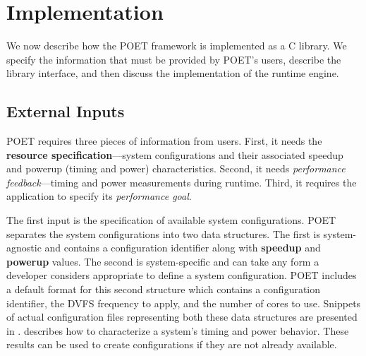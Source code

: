 \section{Implementation}
\label{sec:poet-implementation}

We now describe how the POET framework is implemented as a C library.
We specify the information that must be provided by POET's users, describe the library interface, and then discuss the implementation of the runtime engine.

\subsection{External Inputs}

POET requires three pieces of information from users.
First, it needs the \textbf{resource specification}---system configurations and their associated speedup and powerup (timing and power) characteristics.
Second, it needs \emph{performance feedback}---timing and power measurements during runtime.
Third, it requires the application to specify its \emph{performance goal}.

The first input is the specification of available system configurations.
POET separates the system configurations into two data structures.
The first is system-agnostic and contains a configuration identifier along with \textbf{speedup} and \textbf{powerup} values.
The second is system-specific and can take any form a developer considers appropriate to define a system configuration.
POET includes a default format for this second structure which contains a configuration identifier, the DVFS frequency to apply, and the number of cores to use.
Snippets of actual configuration files representing both these data structures are presented in .
 describes how to characterize a system's timing and power behavior.
These results can be used to create configurations if they are not already available.


